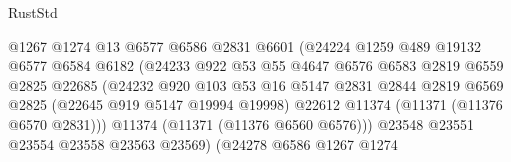 \begin{lexlean}{RustStd}
\begin{coremodule}
                                        @1267
                                        @1274
                                        @13
                                        @6577
                                        @6586
                                        @2831
                                        @6601
                                        (@24224
                                          @1259
                                          @489
                                          @19132
                                          @6577
                                          @6584
                                          @6182
                                          (@24233
                                            @922
                                            @53
                                            @55
                                            @4647
                                            @6576
                                            @6583
                                            @2819
                                            @6559
                                            @2825
                                            @22685
                                            (@24232
                                              @920
                                              @103
                                              @53
                                              @16
                                              @5147
                                              @2831
                                              @2844
                                              @2819
                                              @6569
                                              @2825
                                              (@22645 @919 @5147 @19994 @19998)
                                              @22612
                                              @11374
                                              (@11371 (@11376 @6570 @2831)))
                                            @11374
                                            (@11371 (@11376 @6560 @6576)))
                                          @23548
                                          @23551
                                          @23554
                                          @23558
                                          @23563
                                          @23569)
                                        (@24278
                                          @6586
                                          @1267
                                          @1274

\end{coremodule}
\end{lexlean}
